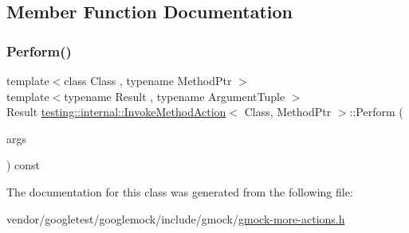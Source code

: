 \subsection{Member Function Documentation}
\mbox{\label{classtesting_1_1internal_1_1_invoke_method_action_aed6971c668bc2c7671d512306b25b1ab}} 
\subsubsection{\texorpdfstring{Perform()}{Perform()}}
{\footnotesize\ttfamily template$<$class Class , typename Method\+Ptr $>$ \\
template$<$typename Result , typename Argument\+Tuple $>$ \\
Result \hyperlink{classtesting_1_1internal_1_1_invoke_method_action}{testing\+::internal\+::\+Invoke\+Method\+Action}$<$ Class, Method\+Ptr $>$\+::Perform (\begin{DoxyParamCaption}\item[{const Argument\+Tuple \&}]{args }\end{DoxyParamCaption}) const\hspace{0.3cm}{\ttfamily [inline]}}



The documentation for this class was generated from the following file\+:\begin{DoxyCompactItemize}
\item 
vendor/googletest/googlemock/include/gmock/\hyperlink{gmock-more-actions_8h}{gmock-\/more-\/actions.\+h}\end{DoxyCompactItemize}
